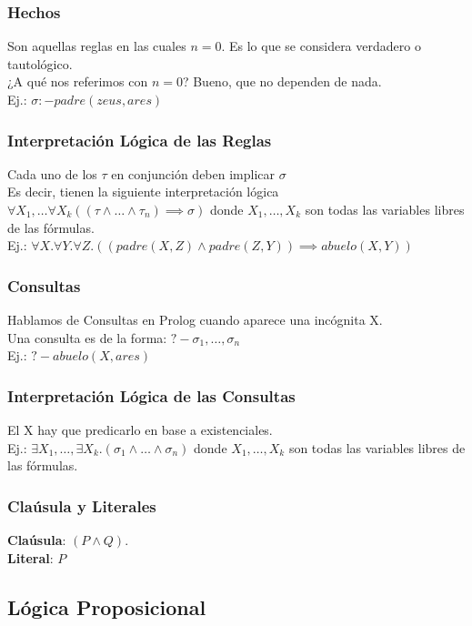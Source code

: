 \documentclass[10pt,a4paper]{article}
\begin{document}
\subsubsection*{Hechos}
Son aquellas reglas en las cuales $n = 0$. Es lo que se considera verdadero o tautológico. \\
¿A qué nos referimos con $n=0$? Bueno, que no dependen de nada. \\
Ej.: $\sigma :- padre(zeus, ares)$ 
\subsubsection*{Interpretación Lógica de las Reglas}
Cada uno de los $\tau$ en conjunción deben implicar $\sigma$ \\
Es decir, tienen la siguiente interpretación lógica $\forall X_{1}, \dots \forall X_{k}((\tau \land \dots \land \tau_{n}) \implies \sigma)$ donde $X_{1}, \dots, X_{k}$ son todas las variables libres de las fórmulas. \\
Ej.: $\forall X . \forall Y . \forall Z . ((padre(X,Z) \land padre(Z,Y)) \implies abuelo(X,Y))$
\subsubsection*{Consultas}
Hablamos de Consultas en Prolog cuando aparece una incógnita X. \\
Una consulta es de la forma: $?- \sigma_{1}, \dots, \sigma_{n}$ \\
Ej.: $?-abuelo(X, ares)$ 
\subsubsection*{Interpretación Lógica de las Consultas}
El X hay que predicarlo en base a existenciales. \\
Ej.: $\exists X_{1}, \dots, \exists X_{k} . (\sigma_{1} \land \dots \land \sigma_{n})$ donde $X_{1}, \dots, X_{k}$ son todas las variables libres de las fórmulas. \\
\subsubsection*{Claúsula y Literales}
\textbf{Claúsula}: $(P \land Q)$. \\
\textbf{Literal}: $P$
\subsection*{Lógica Proposicional}
\end{document}
